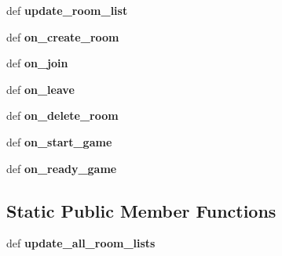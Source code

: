 \begin{DoxyCompactItemize}
\item 
\hypertarget{classcards-with-friends_1_1main_1_1_card_namespace_a617d0bb738dbbf8fd826f9318f05ae24}{def {\bfseries update\-\_\-room\-\_\-list}}\label{classcards-with-friends_1_1main_1_1_card_namespace_a617d0bb738dbbf8fd826f9318f05ae24}

\item 
\hypertarget{classcards-with-friends_1_1main_1_1_card_namespace_a53f235205f1ada1ca3740c6c928b767c}{def {\bfseries on\-\_\-create\-\_\-room}}\label{classcards-with-friends_1_1main_1_1_card_namespace_a53f235205f1ada1ca3740c6c928b767c}

\item 
\hypertarget{classcards-with-friends_1_1main_1_1_card_namespace_ae3b139f15f78af1b203401761171ff3b}{def {\bfseries on\-\_\-join}}\label{classcards-with-friends_1_1main_1_1_card_namespace_ae3b139f15f78af1b203401761171ff3b}

\item 
\hypertarget{classcards-with-friends_1_1main_1_1_card_namespace_add17d030e32cfedacf12bbf272b29635}{def {\bfseries on\-\_\-leave}}\label{classcards-with-friends_1_1main_1_1_card_namespace_add17d030e32cfedacf12bbf272b29635}

\item 
\hypertarget{classcards-with-friends_1_1main_1_1_card_namespace_a89dbdc0ba5113019e9b3dfd8f298c026}{def {\bfseries on\-\_\-delete\-\_\-room}}\label{classcards-with-friends_1_1main_1_1_card_namespace_a89dbdc0ba5113019e9b3dfd8f298c026}

\item 
\hypertarget{classcards-with-friends_1_1main_1_1_card_namespace_ae1fa0fdb798cbeec1b68d9b52799e306}{def {\bfseries on\-\_\-start\-\_\-game}}\label{classcards-with-friends_1_1main_1_1_card_namespace_ae1fa0fdb798cbeec1b68d9b52799e306}

\item 
\hypertarget{classcards-with-friends_1_1main_1_1_card_namespace_a4b5eb60a8135ebd793af13eb38dbdf7d}{def {\bfseries on\-\_\-ready\-\_\-game}}\label{classcards-with-friends_1_1main_1_1_card_namespace_a4b5eb60a8135ebd793af13eb38dbdf7d}

\end{DoxyCompactItemize}
\subsection*{Static Public Member Functions}
\begin{DoxyCompactItemize}
\item 
\hypertarget{classcards-with-friends_1_1main_1_1_card_namespace_a614873907f405a35cb1430f7686450d8}{def {\bfseries update\-\_\-all\-\_\-room\-\_\-lists}}\label{classcards-with-friends_1_1main_1_1_card_namespace_a614873907f405a35cb1430f7686450d8}

\end{DoxyCompactItemize}
